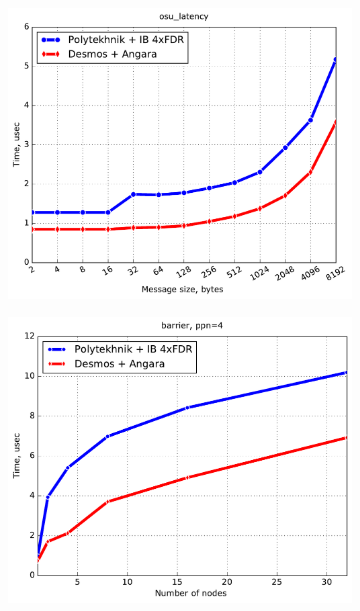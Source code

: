 \documentclass{llncs}
\begin{document}
\begin{figure}[th!]
\centering
   \begin{subfigure}{0.45\textwidth}
  \includegraphics[width=1\textwidth]{img/osu_latency.pdf}\caption{\label{fig:latency}}
  \end{subfigure}
  \begin{subfigure}{0.45\textwidth}
  \includegraphics[width=1\textwidth]{img/barrier_ppn4.pdf}\caption{\label{fig:barrier}}
   \end{subfigure}
   \begin{subfigure}{0.45\textwidth}

\end{subfigure}
\end{figure}
\end{document}
